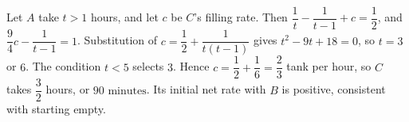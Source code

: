 Let $A$ take $t>1$ hours, and let $c$ be $C$'s filling rate. Then $\dfrac{1}{t}-\dfrac{1}{t-1}+c=\dfrac{1}{2}$, and $\dfrac{9}{4}c-\dfrac{1}{t-1}=1$. Substitution of $c=\dfrac{1}{2}+\dfrac{1}{t(t-1)}$ gives $t^2-9t+18=0$, so $t=3$ or $6$. The condition $t<5$ selects $3$. Hence $c=\dfrac{1}{2}+\dfrac{1}{6}=\dfrac{2}{3}$ tank per hour, so $C$ takes $\dfrac{3}{2}$ hours, or $\boxed{90\text{ minutes}}$. Its initial net rate with $B$ is positive, consistent with starting empty.
